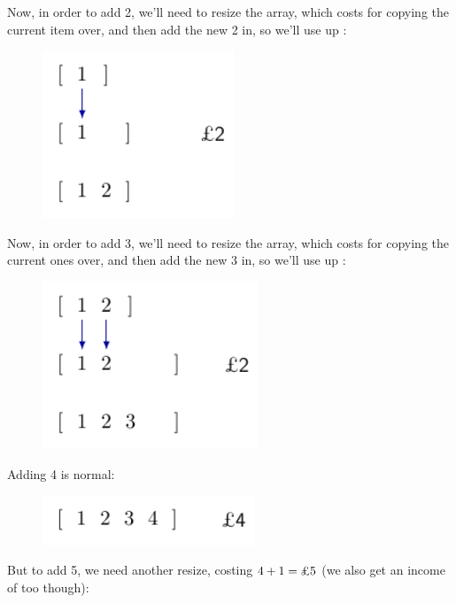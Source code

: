 Now, in order to add 2, we'll need to resize the array, which costs
 for copying the current item over, and then add the new 2 in, so
we'll use up :

\begin{figure}[H]
  \centering
  \includegraphics[height=50mm]{diagrams/banker2.pdf}
  \label{banker2}
\end{figure}

Now, in order to add 3, we'll need to resize the array, which costs
 for copying the current ones over, and then add the new 3 in, so
we'll use up :

\begin{figure}[H]
  \centering
  \includegraphics[height=50mm]{diagrams/banker3.pdf}
  \label{banker3}
\end{figure}

Adding 4 is normal:

\begin{figure}[H]
  \centering
  \includegraphics[height=15mm]{diagrams/banker4.pdf}
  \label{banker4}
\end{figure}

But to add 5, we need another resize, costing $4 + 1 = \text{\textsterling} 5$
(we also get an income of  too though):


